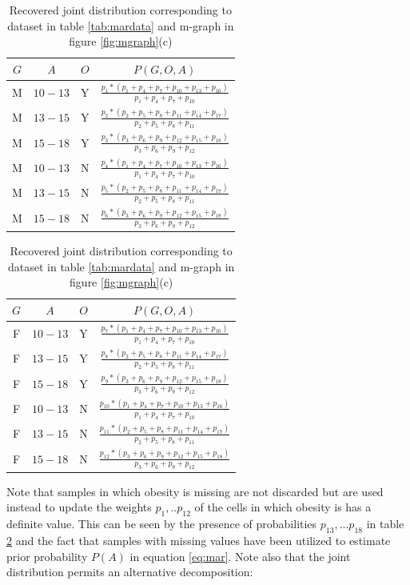 \documentclass[12pt]{article}
\begin{document}
\begin{table}[h]
	\caption{Recovered joint distribution corresponding to dataset in table \ref{tab:mardata} and m-graph in figure \ref{fig:mgraph}(c)}
	\centering
	\begin{minipage}[t]{.5\textwidth}
	\begin{tabular}{|c|c|c|c|}
	\hline
	$G$  & $A$  & $O$ &  $P(G,O,A)$ \\
	\hline	
	M & $10-13$ & Y  & $\frac{p_1*(p_1+p_4+p_7+p_{10}+p_{13}+p_{16})}{p_1+p_4+p_7+p_{10}}$\\
	M & $13-15$ & Y  & $\frac{p_2*(p_2+p_5+p_8+p_{11}+p_{14}+p_{17})}{p_2+p_5+p_8+p_{11}}$\\
	M & $15-18$ & Y  & $\frac{p_3*(p_3+p_6+p_9+p_{12}+p_{15}+p_{18})}{p_3+p_6+p_9+p_{12}}$\\
	M & $10-13$ & N  & $\frac{p_4*(p_1+p_4+p_7+p_{10}+p_{13}+p_{16})}{p_1+p_4+p_7+p_{10}}$\\
	M & $13-15$ & N  & $\frac{p_5*(p_2+p_5+p_8+p_{11}+p_{14}+p_{17})}{p_2+p_5+p_8+p_{11}}$\\
	M & $15-18$ & N  & $\frac{p_6*(p_3+p_6+p_9+p_{12}+p_{15}+p_{18})}{p_3+p_6+p_9+p_{12}}$\\
	\hline
	\end{tabular}
	\end{minipage}
\begin{minipage}[t]{.48    \textwidth}
	\begin{tabular}{|c|c|c|c|}
		\hline
		$G$  & $A$  & $O$ &  $P(G,O,A)$ \\
		\hline	
		F & $10-13$ & Y  & $\frac{p_7*(p_1+p_4+p_7+p_{10}+p_{13}+p_{16})}{p_1+p_4+p_7+p_{10}}$\\
		F & $13-15$ & Y  & $\frac{p_8*(p_2+p_5+p_8+p_{11}+p_{14}+p_{17})}{p_2+p_5+p_8+p_{11}}$\\
		F & $15-18$ & Y  & $\frac{p_9*(p_3+p_6+p_9+p_{12}+p_{15}+p_{18})}{p_3+p_6+p_9+p_{12}}$\\
		F & $10-13$ & N  & $\frac{p_{10}*(p_1+p_4+p_7+p_{10}+p_{13}+p_{16})}{p_1+p_4+p_7+p_{10}}$\\
		F & $13-15$ & N  & $\frac{p_{11}*(p_2+p_5+p_8+p_{11}+p_{14}+p_{17})}{p_2+p_5+p_8+p_{11}}$\\
		F & $15-18$ & N  & $\frac{p_{12}*(p_3+p_6+p_9+p_{12}+p_{15}+p_{18})}{p_3+p_6+p_9+p_{12}}$\\
		\hline
	\end{tabular}
\end{minipage}
\label{tab:recovered}
\end{table}
	Note that samples in which obesity is missing are not discarded but are used instead to update the weights $p_1,..p_{12}$ of the cells in which obesity is has a definite value. This can be seen by the presence of probabilities $p_{13},...p_{18}$ in table \ref{tab:recovered} and the fact that samples with missing values have been utilized to estimate prior probability $P(A)$ in equation \ref{eq:mar}. Note also that the joint distribution permits an alternative decomposition: 
\end{document}
